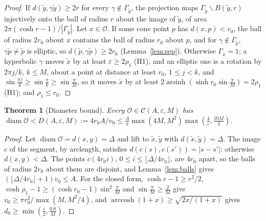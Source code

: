 \documentclass[pdflatex,sn-mathphys-num]{sn-jnl}
\theoremstyle{thmstyleone}%
\newtheorem{theorem}{Theorem}[section]%
\theoremstyle{thmstylethree}%
\newcommand{\Orb}{\mathcal{O}}
\newcommand{\Cl}{\mathcal{C}}
\newcommand{\diam}{\operatorname{diam}}
\begin{document}
\begin{proof}
If $d(\tilde y,\gamma\tilde y)\ge2r$ for every $\gamma\notin\Gamma_{\tilde y}$, the projection maps $\Gamma_{\tilde y}\backslash B(\tilde y,r)$ injectively onto the ball of radius $r$ about the image of $\tilde y$, of area $2\pi(\cosh r-1)/|\Gamma_{\tilde y}|$. Let $x\in\Orb$. If some cone point $p$ has $d(x,p)<r_0$, the ball of radius $2r_0$ about $x$ contains the ball of radius $r_0$ about $p$, and for $\gamma\notin\Gamma_{\tilde p}$, $\gamma\tilde p\ne\tilde p$ is elliptic, so $d(\tilde p,\gamma\tilde p)\ge2r_0$ (Lemma~\ref{lem:sep}). Otherwise $\Gamma_{\tilde x}=1$; a hyperbolic $\gamma$ moves $\tilde x$ by at least $\varepsilon\ge2\rho_1$ (H1), and an elliptic one is a rotation by $2\pi j/k$, $k\le M$, about a point at distance at least $r_0$, $1\le j<k$, and $\sin\frac{\pi j}k\ge\sin\frac\pi k\ge\sin\frac\pi M$, so it moves $\tilde x$ by at least $2\operatorname{arsinh}(\sinh r_0\sin\frac\pi M)=2\rho_1$ (H1); and $\rho_1\le r_0$.
\end{proof}

\begin{theorem}[Diameter bound]\label{thm:diam}
Every $\Orb\in\Cl(A,\varepsilon,M)$ has $\diam\Orb<D(A,\varepsilon,M):=4r_0A/v_0\le\frac A\pi\max(4M,M^2)\max(\frac4\varepsilon,\frac{10M}3)$.
\end{theorem}

\begin{proof}
Let $\diam\Orb=d(x,y)=\Delta$ and lift to $\tilde x,\tilde y$ with $d(\tilde x,\tilde y)=\Delta$. The image $c$ of the segment, by arclength, satisfies $d(c(s),c(s'))=|s-s'|$: otherwise $d(x,y)<\Delta$. The points $c(4r_0i)$, $0\le i\le\lfloor\Delta/4r_0\rfloor$, are $4r_0$ apart, so the balls of radius $2r_0$ about them are disjoint, and Lemma~\ref{lem:balls} gives $(\lfloor\Delta/4r_0\rfloor+1)v_0\le A$. For the closed form, $\cosh r-1\ge r^2/2$, $\cosh\rho_1-1\ge(\cosh r_0-1)\sin^2\frac\pi M$ and $\sin\frac\pi M\ge\frac2M$ give $v_0\ge\pi r_0^2/\max(M,M^2/4)$, and $\operatorname{arccosh}(1+x)\ge\sqrt{2x/(1+x)}$ gives $d_0\ge\min(\frac\varepsilon2,\frac{0.6}M)$.
\end{proof}
\end{document}
